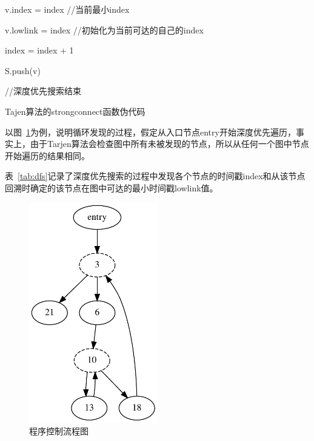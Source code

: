  
\begin{algorithm}[htb]
  \small
  \SetAlgoLined
   v.index = index //当前最小index
   
   v.lowlink = index //初始化为当前可达的自己的index
   
   index = index + 1
   
   S.push(v)
 
   //深度优先搜索结束
   
  \caption{Tajen算法的strongconnect函数伪代码}    
  \label{algo:strongconnect}
\end{algorithm}

以图~\ref{fig:dfs}为例，说明循环发现的过程，假定从入口节点entry开始深度优先遍历，事实上，由于Tarjen算法会检查图中所有未被发现的节点，所以从任何一个图中节点开始遍历的结果相同。

表~\ref{tab:dfs}记录了深度优先搜索的过程中发现各个节点的时间戳index和从该节点回溯时确定的该节点在图中可达的最小时间戳lowlink值。

\begin{figure}[htb]
  \centering
  \includegraphics[width=0.5\textwidth]{figures/cfg.pdf}
  \caption{程序控制流程图}
  \label{fig:dfs}
\end{figure}

